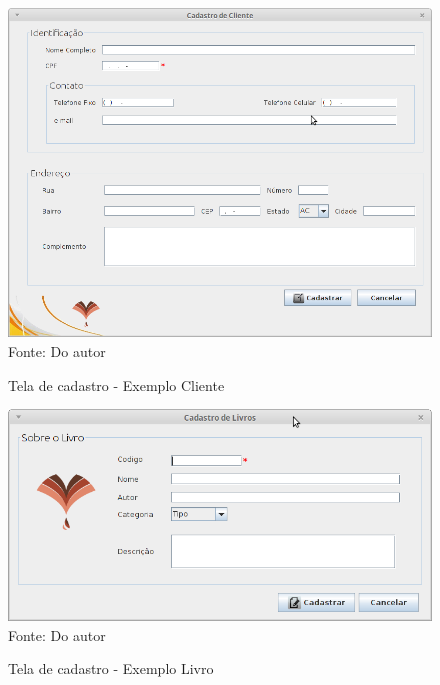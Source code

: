  \begin{figure}[H]
	\centering 
	\caption{Tela de cadastro - Exemplo Cliente}
	\label{cadastro_cliente}
	\includegraphics[scale = 0.5]{imagens/cadastro-cliente.png}
	\\Fonte: Do autor
\end{figure}

\begin{figure}[H]
	\centering 
	\caption{Tela de cadastro - Exemplo Livro}
	\label{cadastro_livro}
	\includegraphics[scale = 0.6]{imagens/cadastrar-livro.png}
	\\Fonte: Do autor
\end{figure}


